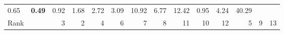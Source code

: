 \begin{tabular}{ll|rrrrrrrrr|rrr}
  


  
  0.65 & \textbf{0.49} & 0.92 & 1.68 & 2.72 & 3.09 & 10.92 & 6.77 & 12.42 & 0.95 & 4.24 & 40.29 \\

  Rank & &
  3 & 2 & 4 & 6 & 7 & 8 & 11 & 10 & 12 & 5 & 9 & 13 \\\hline\hline
  

\end{tabular}
